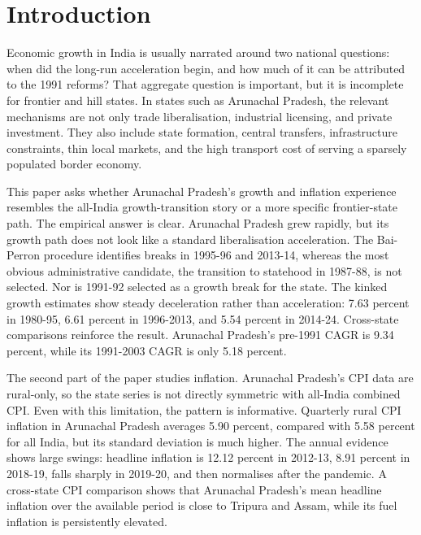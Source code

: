 \documentclass[11pt,a4paper]{article}
\begin{document}
\newpage
\tableofcontents
\newpage

\section{Introduction}

Economic growth in India is usually narrated around two national questions: when did the long-run acceleration begin, and how much of it can be attributed to the 1991 reforms? That aggregate question is important, but it is incomplete for frontier and hill states. In states such as Arunachal Pradesh, the relevant mechanisms are not only trade liberalisation, industrial licensing, and private investment. They also include state formation, central transfers, infrastructure constraints, thin local markets, and the high transport cost of serving a sparsely populated border economy.

This paper asks whether Arunachal Pradesh's growth and inflation experience resembles the all-India growth-transition story or a more specific frontier-state path. The empirical answer is clear. Arunachal Pradesh grew rapidly, but its growth path does not look like a standard liberalisation acceleration. The Bai-Perron procedure identifies breaks in 1995-96 and 2013-14, whereas the most obvious administrative candidate, the transition to statehood in 1987-88, is not selected. Nor is 1991-92 selected as a growth break for the state. The kinked growth estimates show steady deceleration rather than acceleration: 7.63 percent in 1980-95, 6.61 percent in 1996-2013, and 5.54 percent in 2014-24. Cross-state comparisons reinforce the result. Arunachal Pradesh's pre-1991 CAGR is 9.34 percent, while its 1991-2003 CAGR is only 5.18 percent.

The second part of the paper studies inflation. Arunachal Pradesh's CPI data are rural-only, so the state series is not directly symmetric with all-India combined CPI. Even with this limitation, the pattern is informative. Quarterly rural CPI inflation in Arunachal Pradesh averages 5.90 percent, compared with 5.58 percent for all India, but its standard deviation is much higher. The annual evidence shows large swings: headline inflation is 12.12 percent in 2012-13, 8.91 percent in 2018-19, falls sharply in 2019-20, and then normalises after the pandemic. A cross-state CPI comparison shows that Arunachal Pradesh's mean headline inflation over the available period is close to Tripura and Assam, while its fuel inflation is persistently elevated.
\end{document}
